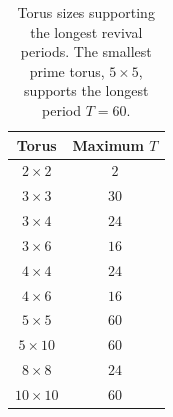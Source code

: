 \begin{table}[htbp]
\centering
\caption{Torus sizes supporting the longest revival periods. The
smallest prime torus, $5\times5$, supports the longest period $T=60$.}
\label{tab:max-period}
\begin{tabular}{cc}
\toprule
Torus & Maximum $T$ \\
\midrule
$2\times2$   & $2$ \\
$3\times3$   & $30$ \\
$3\times4$   & $24$ \\
$3\times6$   & $16$ \\
$4\times4$   & $24$ \\
$4\times6$   & $16$ \\
$5\times5$   & $60$ \\
$5\times10$  & $60$ \\
$8\times8$   & $24$ \\
$10\times10$ & $60$ \\
\bottomrule
\end{tabular}
\end{table}
